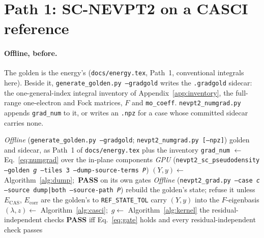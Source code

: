 \documentclass[11pt]{article}
\newcommand{\code}[1]{\texttt{#1}}
\newcommand{\Ecas}{E_{\mathrm{CAS}}}
\newcommand{\Ecorr}{E_{\mathrm{corr}}}
\begin{document}
\section{Path 1: SC-NEVPT2 on a CASCI reference}
\label{sec:sc-casci}

\paragraph{Offline, before.} The golden is the energy's
(\code{docs/energy.tex}, Path~1, conventional integrals here). Beside it,
\code{generate\_golden.py --gradgold} writes the \code{.gradgold} sidecar: the
one-general-index integral inventory of Appendix~\ref{app:inventory}, the
full-range one-electron and Fock matrices, $F$ and \code{mo\_coeff}.
\code{nevpt2\_numgrad.py} appends \code{grad\_num} to it, or writes an
\code{.npz} for a case whose committed sidecar carries none.

\begin{algorithm}[htbp]
\caption{Path 1, SC on CASCI orbitals}
\label{alg:path1}
\begin{algorithmic}[1]
\Statex \textit{Offline} (\code{generate\_golden.py --gradgold}; \code{nevpt2\_numgrad.py [--npz]})
\State golden and sidecar, as Path~1 of \code{docs/energy.tex} plus the inventory
\State \code{grad\_num} $\gets$ Eq.~\eqref{eq:numgrad} over the in-plane components
\Statex \textit{GPU} (\code{nevpt2\_sc\_pseudodensity --golden \textit{g} --tiles 3 --dump-source-terms \textit{P}})
\State $(Y, y) \gets$ Algorithm~\ref{alg:dump};\ \textbf{PASS} on its own gates
\Statex \textit{Offline} (\code{nevpt2\_grad.py --case \textit{c} --source dump|both --source-path \textit{P}})
\State rebuild the golden's state; refuse it unless $\Ecas$, $\Ecorr$ are the golden's to \code{REF\_STATE\_TOL}
\State carry $(Y, y)$ into the $F$-eigenbasis 
\State $(\lambda, z) \gets$ Algorithm~\ref{alg:casci};\ $g \gets$ Algorithm~\ref{alg:kernel}
\State the residual-independent checks \Comment{\S\ref{sec:checks}}
\State \textbf{PASS} iff Eq.~\eqref{eq:gate} holds and every residual-independent check passes
\end{algorithmic}
\end{algorithm}
\end{document}
